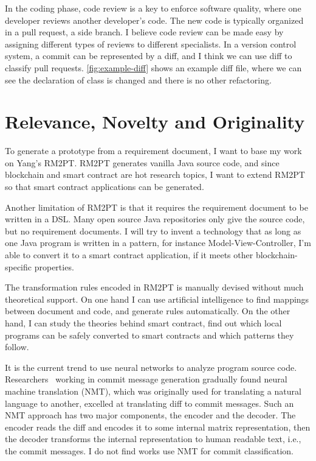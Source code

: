 In the coding phase, code review is a key to enforce software quality, where one developer reviews another developer's code. The new code is typically organized in a pull request, a side branch.
I believe code review can be made easy by assigning different types of reviews to different specialists. In a version control system, a commit can be represented by a diff, and I think we can use diff to classify pull requests. \autoref{fig:example-diff} shows an example diff file, where we can see the declaration of class  is changed and there is no other refactoring.


\section{Relevance, Novelty and Originality}

To generate a prototype from a requirement document, I want to base my work on Yang's RM2PT. RM2PT generates vanilla Java source code, and since blockchain and smart contract are hot research topics, I want to extend RM2PT so that smart contract applications can be generated.

Another limitation of RM2PT is that it requires the requirement document to be written in a DSL. Many open source Java repositories only give the source code, but no requirement documents.
I will try to invent a technology that as long as one Java program is written in a pattern, for instance Model-View-Controller, I'm able to convert it to a smart contract application, if it meets other blockchain-specific properties.

The transformation rules encoded in RM2PT is manually devised without much theoretical support. On one hand I can use artificial intelligence to find mappings between document and code, and generate rules automatically. On the other hand, I can study the theories behind smart contract, find out which local programs can be safely converted to smart contracts and which patterns they follow.

It is the current trend to use neural networks to analyze program source code.
Researchers~\cite{xu2019commit,liu2019generating} working in commit message generation gradually found neural machine translation (NMT),
which was originally used for translating a natural language to another,
excelled at translating diff to commit messages.
Such an NMT approach has two major components, the encoder and the decoder.
The encoder reads the diff and encodes it to some internal matrix representation,
then the decoder transforms the internal representation to human readable text, i.e., the commit messages.
I do not find works use NMT for commit classification.



